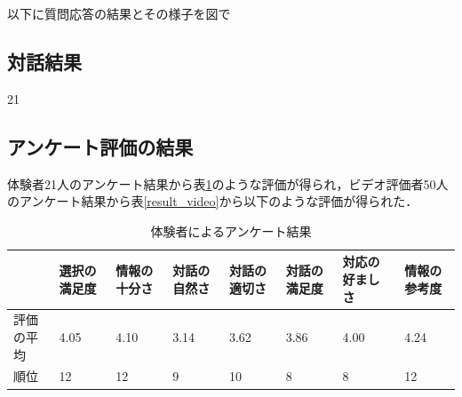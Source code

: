 以下に質問応答の結果とその様子を図で


\subsection{対話結果}
21

\subsection{アンケート評価の結果}
体験者21人のアンケート結果から表\ref{result_taiken}のような評価が得られ，ビデオ評価者50人のアンケート結果から表\ref{result_video}から以下のような評価が得られた．

\begin{table}[hbtp]
    \caption{体験者によるアンケート結果}
    \label{result_taiken}
    \centering
    \begin{tabular}{l|l|l|l|l|l|l|l}
    \hline
          & 選択の満足度 & 情報の十分さ & 対話の自然さ & 対話の適切さ & 対話の満足度 & 対応の好ましさ & 情報の参考度 \\ \hline
    評価の平均 & 4.05   & 4.10   & 3.14   & 3.62   & 3.86   & 4.00    & 4.24   \\ \hline
    順位    & 12     & 12     & 9      & 10     & 8      & 8       & 12     \\ \hline
    \end{tabular}
\end{table}

